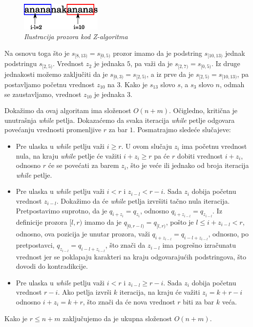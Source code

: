 \begin{figure}[H]
    \centering
    \includegraphics[width=40mm]{../img/zalgo1.eps}
    \caption*{\textit{Ilustracija prozora kod Z-algoritma}}
\end{figure}

Na osnovu toga \v sto je $s_{[8,13)} = s_{[0,5)}$ prozor imamo da je podstring $s_{[10,13)}$ jednak podstringu $s_{[2,5)}$. Vrednost $z_2$ je jednaka $5$, pa va\v zi da je $s_{[2,7)} = s_{[0,5)}$. Iz druge jednakosti mo\v zemo zaklju\v citi da je $s_{[0,3)} = s_{[2,5)}$, a iz prve da je $s_{[2,5)} = s_{[10,13)}$, pa postavljamo po\v cetnu vrednost $z_{10}$ na $3$. Kako je $s_{13}$ slovo $s$, a $s_3$ slovo $n$, odmah se zaustavljamo, vrednost $z_{10}$ je jednaka $3$.

Doka\v zimo da ovaj algoritam ima slo\v zenost $O(n+m)$. O\v cigledno, kriti\v cna je unutra\v snja \textit{while} petlja. Dokaza\' cemo da svaka iteracija \textit{while} petlje odgovara pove\' canju vrednosti promenljive $r$ za bar $1$. Posmatrajmo slede\' ce slu\v cajeve:

\begin{itemize}
\item Pre ulaska u \textit{while} petlju va\v zi $i \geq r$. U ovom slu\v caju $z_i$ ima po\v cetnu vrednost nula, na kraju \textit{while} petlje \' ce va\v ziti $i + z_i \geq r$ pa \' ce $r$ dobiti vrednost $i + z_i$, odnosno $r$ \' ce se pove\' cati za barem $z_i$, \v sto je ve\'ce ili jednako od broja iteracija \textit{while} petlje.
\item Pre ulaska u \textit{while} petlju va\v zi $i < r$ i $z_{i-l} < r-i$. Sada $z_i$ dobija po\v cetnu vrednost $z_{i-l}$. Doka\v zimo da \' ce \textit{while} petlja izvr\v siti ta\v cno nula iteracija. Pretpostavimo suprotno, da je $q_{i+z_i} = q_{z_i}$, odnosno $q_{i+z_{i-l}} = q_{z_{i-l}}$. Iz definicije prozora $[l, r)$ imamo da je $q_{[0, r-l)} = q_{[l, r)}$, po\v sto je $l \leq i+z_{i-l} < r$, odnosno, ova pozicija je unutar prozora, va\v zi $q_{i+z_{i-l}} = q_{i-l+z_{i-l}}$, odnosno, po pretpostavci, $q_{z_{i-l}} = q_{i-l+z_{i-l}}$, \v sto zna\v ci da $z_{i-l}$ ima pogre\v sno izra\v cunatu vrednost jer se poklapaju karakteri na kraju odgovaraju\' cih podstringova, \v sto dovodi do kontradikcije.
\item Pre ulaska u \textit{while} petlju va\v zi $i < r$ i $z_{i-l} \geq r-i$. Sada $z_i$ dobija po\v cetnu vrednost $r-i$. Ako petlja izvr\v si $k$ iteracija, na kraju \' ce va\v ziti $z_i=k+r-i$ odnosno $i+z_i=k+r$, \v sto zna\v ci da \' ce nova vrednost $r$ biti za bar $k$ ve\' ca.
\end{itemize}

Kako je $r \leq n+m$ zaklju\v cujemo da je ukupna slo\v zenost $O(n+m)$.
